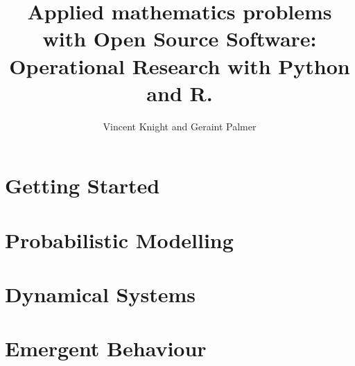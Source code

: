 \documentclass[Alon2,singlecolor,11pt]{Alon}
\title{Applied mathematics problems with Open Source Software:
       Operational Research with Python and R.}
\author{Vincent Knight and Geraint Palmer}
\begin{document}
\frontmatter



\halftitle

\booktitle

\locpage



\cleardoublepage
\setcounter{page}{7} %
\tableofcontents






\mainmatter

\part{Getting Started}


\part{Probabilistic Modelling}


\part{Dynamical Systems}


\part{Emergent Behaviour}






\printindex
\cleardoublepage
\end{document}
